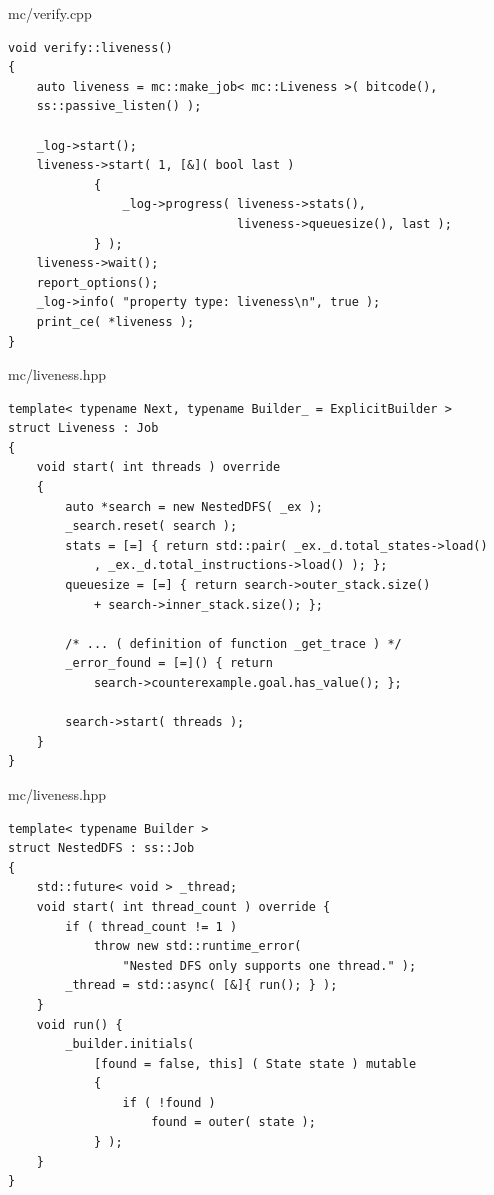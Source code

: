 \documentclass[12pt]{beamer}
\begin{document}

\begin{frame}[fragile]{mc/verify.cpp}
\begin{lstlisting}[basicstyle=\footnotesize\ttfamily]
void verify::liveness()
{
    auto liveness = mc::make_job< mc::Liveness >( bitcode(),
    ss::passive_listen() );

    _log->start();
    liveness->start( 1, [&]( bool last )
            {
                _log->progress( liveness->stats(),
                                liveness->queuesize(), last );
            } );
    liveness->wait();
    report_options();
    _log->info( "property type: liveness\n", true );
    print_ce( *liveness );
}
\end{lstlisting}
\end{frame}

\begin{frame}[fragile]{mc/liveness.hpp}
\begin{lstlisting}[basicstyle=\footnotesize\ttfamily]
template< typename Next, typename Builder_ = ExplicitBuilder >
struct Liveness : Job
{
    void start( int threads ) override
    {
        auto *search = new NestedDFS( _ex );
        _search.reset( search );
        stats = [=] { return std::pair( _ex._d.total_states->load()
            , _ex._d.total_instructions->load() ); };
        queuesize = [=] { return search->outer_stack.size() 
            + search->inner_stack.size(); };

        /* ... ( definition of function _get_trace ) */ 
        _error_found = [=]() { return 
            search->counterexample.goal.has_value(); };

        search->start( threads );
    }
}
\end{lstlisting}
\end{frame}

\begin{frame}[fragile]{mc/liveness.hpp}
\begin{lstlisting}[basicstyle=\footnotesize\ttfamily]
template< typename Builder >
struct NestedDFS : ss::Job
{
    std::future< void > _thread;
    void start( int thread_count ) override {
        if ( thread_count != 1 )
            throw new std::runtime_error( 
                "Nested DFS only supports one thread." );
        _thread = std::async( [&]{ run(); } );
    }
    void run() {
        _builder.initials( 
            [found = false, this] ( State state ) mutable
            {
                if ( !found )
                    found = outer( state );
            } );
    }
}
\end{lstlisting}
\end{frame}
\end{document}
